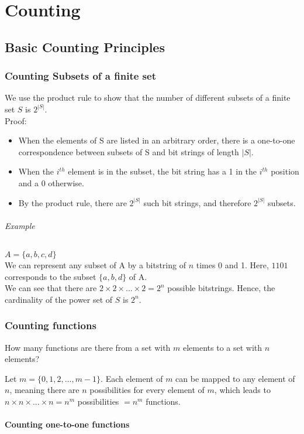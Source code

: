 \documentclass[10pt,a4paper]{book}
\begin{document}
\part{Counting}
\chapter{Basic Counting Principles}
\section{Counting Subsets of a finite set}
We use the product rule to show that the number of different subsets of a finite set $S$ is $2^{|S|}$.\\
Proof:
\begin{itemize}
\item When the elements of S are listed in an arbitrary order, there is a one-to-one correspondence between subsets of S and bit strings of length $|S|$.
\item When the $i^{th}$ element is in the subset, the bit string has a 1 in the $i^{th}$ position and a 0 otherwise.
\item By the product rule, there are $2^{|S|}$ such bit strings, and therefore $2^{|S|}$ subsets.
\end{itemize}
\paragraph*{Example}
$A = \{a,b,c,d\}$\\
We can represent any subset of A by a bitstring of $n$ times 0 and 1. Here, $1101$ corresponds to the subset $\{a,b,d\}$ of A.\\
We can see that there are $2\times 2\times ... \times 2 = 2^n$ possible bitstrings. Hence, the cardinality of the power set of $S$ is $2^n$.
\section{Counting functions}
How many functions are there from a set with $m$ elements to a set with $n$ elements?\par 
Let $m = \{0,1,2,...,m-1\}$. Each element of $m$ can be mapped to any element of $n$, meaning there are $n$ possibilities for every element of $m$, which leads to $n\times n\times ...\times n = n^m$ possibilities $=n^m$ functions.
\subsection{Counting one-to-one functions}
\end{document}
